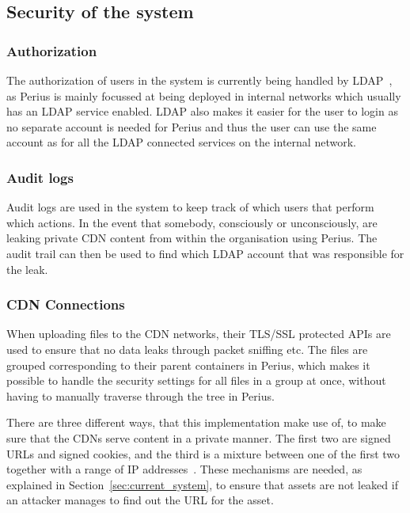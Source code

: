 \documentclass[a4paper,12pt]{article}
\newcounter{subsubsubsection}[subsubsection]
\begin{document}
\newpage
\subsection{Security of the system}
\subsubsection{Authorization}
The authorization of users in the system is currently being handled by LDAP~\cite{LDAP}, as Perius 
is mainly focussed at being deployed in internal networks which usually has an LDAP service enabled. 
LDAP also makes it easier for the user to login as no separate account is needed for Perius and 
thus the user can use the same account as for all the LDAP connected services on the internal 
network.

\subsubsection{Audit logs}
Audit logs are used in the system to keep track of which users that perform which actions. In the
event that somebody, consciously or unconsciously, are leaking private CDN content from within the
organisation using Perius. The audit trail can then be used to find which LDAP account that was
responsible for the leak.

\subsubsection{CDN Connections} \label{sec:cdn_connections}
When uploading files to the CDN networks, their TLS/SSL protected APIs are used to ensure that no
data leaks through packet sniffing etc. The files are grouped corresponding to their parent
containers in Perius, which makes it possible to handle the security settings for all files in a
group at once, without having to manually traverse through the tree in Perius.

 \label{sec:private_content}
There are three different ways, that this implementation make use of, to make sure that the CDNs
serve content in a private manner. The first two are signed URLs and signed cookies, and the third
is a mixture between one of the first two together with a range of IP addresses~\cite{AWSPRIVATE}.
These mechanisms are needed, as explained in Section~\ref{sec:current_system}, to ensure that assets
are not leaked if an attacker manages to find out the URL for the asset. \\
\end{document}
